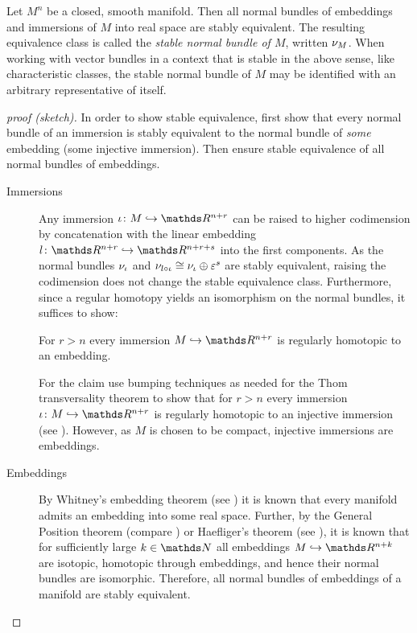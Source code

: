 \begin{LemDef}
  Let $M^n$ be a closed, smooth manifold.
  Then all normal bundles of embeddings and immersions of $M$ into
  real space are stably equivalent.
  The resulting equivalence class is called the
  \emph{stable normal bundle of $M$}, written $\nu_{M}$.
  When working with vector bundles in a context that is stable in the
  above sense, like \forexample characteristic classes, the stable
  normal bundle of $M$ may be identified with an arbitrary
  representative of itself.
  \begin{proof}[proof (sketch)]
    In order to show stable equivalence, first show that every
    normal bundle of an immersion is stably equivalent to the
    normal bundle of \emph{some} embedding (\idest some injective
    immersion). Then ensure stable equivalence of all normal bundles
    of embeddings.
    \begin{description}
    \item[Immersions]
      Any immersion $\imm\colon M\immto\R^{n+r}$ can be raised to
      higher codimension by concatenation with the linear embedding
      $l\colon\R^{n+r}\immto\R^{n+r+s}$ into the first components.
      As the normal bundles $\nu_{{\iota}}$ and
      $\nu_{l\circ{\iota}}\cong\nu_{{\iota}}\oplus\varepsilon^s$ are stably
      equivalent, raising the codimension does not change the stable
      equivalence class.
      Furthermore, since a regular homotopy yields an
      isomorphism on the normal bundles, it suffices to show:
      \begin{claim}
        For $r>n$ every immersion $M\immto\R^{n+r}$ is regularly
        homotopic to an embedding.
      \end{claim}
      For the claim use bumping techniques as needed for the
      Thom transversality theorem to show that for $r>n$ every
      immersion $\imm\colon M\immto\R^{n+r}$ is regularly homotopic to
      an injective immersion
      (see \forexample \cite[Chap.~II, Lemma~2.5]{adachi}).
      However, as $M$ is chosen to be compact, injective immersions
      are embeddings.
    \item[Embeddings]
      By Whitney's embedding theorem
      (see \forexample \cite[Chap.~II.2]{adachi})
      it is known that every manifold admits an embedding into some
      real space.
      Further, by \forexample the General Position theorem
      (compare \cite[Chap.~2]{embeddingsummary})
      or Haefliger's theorem (see \forexample \cite[Chap.~II.1]{adachi}),
      it is known that for sufficiently large $k\in\Nat$ all embeddings
      $M\immto\R^{n+k}$ are isotopic, \idest homotopic through embeddings,
      and hence their normal bundles are isomorphic.
      Therefore, all normal bundles of embeddings of a manifold are
      stably equivalent.
    \end{description}
  \end{proof}
\end{LemDef}

